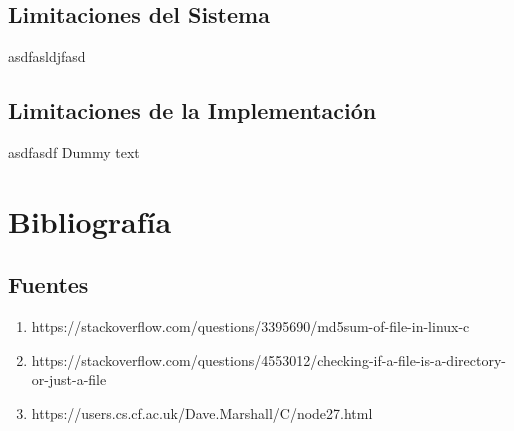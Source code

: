 \documentclass[10pt,a4paper]{report}
\begin{document}
\section{Limitaciones del Sistema}
asdfasldjfasd

\section{Limitaciones de la Implementación}
asdfasdf
Dummy text


\chapter{Bibliografía}
\section{Fuentes}
\begin{enumerate}
\item https://stackoverflow.com/questions/3395690/md5sum-of-file-in-linux-c
\item https://stackoverflow.com/questions/4553012/checking-if-a-file-is-a-directory-or-just-a-file
\item https://users.cs.cf.ac.uk/Dave.Marshall/C/node27.html
\end{enumerate}
\end{document}
